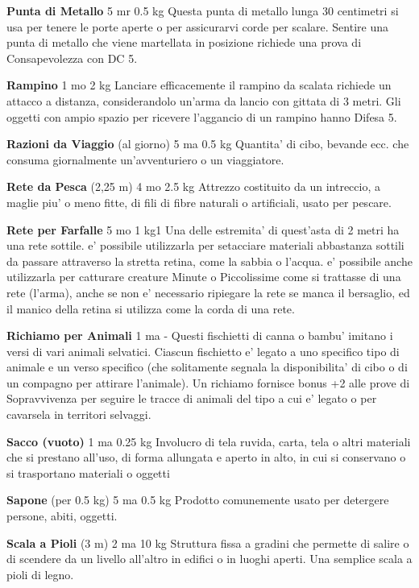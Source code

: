 \documentclass[a4paper,11pt,twoside,openany]{dndbook}
\begin{document}
{\textbf{Punta di Metallo} 5 mr 0.5 kg Questa punta di metallo lunga 30 centimetri si usa per tenere le porte aperte o per assicurarvi corde per scalare. Sentire una punta di metallo che viene martellata in posizione richiede una prova di Consapevolezza con DC 5.

\textbf{Rampino} 1 mo 2 kg Lanciare efficacemente il rampino da scalata richiede un attacco a distanza, considerandolo un'arma da lancio con gittata di 3 metri. Gli oggetti con ampio spazio per ricevere l'aggancio di un rampino hanno Difesa 5.

\textbf{Razioni da Viaggio} (al giorno) 5 ma 0.5 kg Quantita' di cibo, bevande ecc. che consuma giornalmente un'avventuriero o un viaggiatore.

\textbf{Rete da Pesca} (2,25 m) 4 mo 2.5 kg Attrezzo costituito da un intreccio, a maglie piu' o meno fitte, di fili di fibre naturali o artificiali, usato per pescare.

\textbf{Rete per Farfalle} 5 mo 1 kg1 Una delle estremita' di quest'asta di 2 metri ha una rete sottile. e' possibile utilizzarla per setacciare materiali abbastanza sottili da passare attraverso la stretta retina, come la sabbia o l'acqua. e' possibile anche utilizzarla per catturare creature Minute o Piccolissime come si trattasse di una rete (l'arma), anche se non e' necessario ripiegare la rete se manca il bersaglio, ed il manico della retina si utilizza come la corda di una rete.

\textbf{Richiamo per Animali} 1 ma - Questi fischietti di canna o bambu' imitano i versi di vari animali selvatici. Ciascun fischietto e' legato a uno specifico tipo di animale e un verso specifico (che solitamente segnala la disponibilita' di cibo o di un compagno per attirare l'animale). Un richiamo fornisce bonus +2 alle prove di Sopravvivenza per seguire le tracce di animali del tipo a cui e' legato o per cavarsela in territori selvaggi.

\textbf{Sacco (vuoto)} 1 ma 0.25 kg Involucro di tela ruvida, carta, tela o altri materiali che si prestano all'uso, di forma allungata e aperto in alto, in cui si conservano o si trasportano materiali o oggetti

\textbf{Sapone} (per 0.5 kg) 5 ma 0.5 kg Prodotto comunemente usato per detergere persone, abiti, oggetti.

\textbf{Scala a Pioli} (3 m) 2 ma 10 kg Struttura fissa a gradini che permette di salire o di scendere da un livello all'altro in edifici o in luoghi aperti. Una semplice scala a pioli di legno.

}
\end{document}
